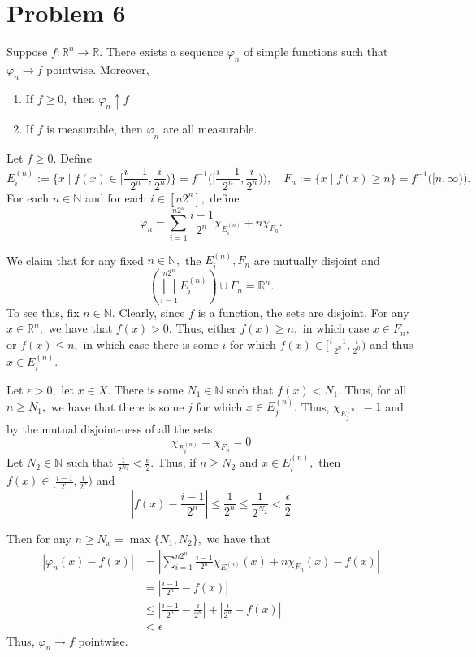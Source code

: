 \documentclass[11pt]{article}
\newcommand{\bbN}{\mathbb{N}}
\newcommand{\bbR}{\mathbb{R}}
\begin{document}
\section*{Problem 6}
\begin{problem}
    Suppose $f: \bbR^n \to \bbR.$ There exists a sequence $\varphi_n$ of simple functions such that $\varphi_n \to f$ pointwise. Moreover, 
    \begin{enumerate}
        \item If $f \geq 0,$ then  $\varphi_n \uparrow f$
        \item If $f $ is measurable, then $\varphi_n$ are all measurable.
    \end{enumerate}
\end{problem}
\begin{solution}
    Let $f\geq 0.$ Define
    \[E_{i}^{(n)} := \{x \mid f(x) \in [\frac{i-1}{2^n}, \frac{i}{2^n})\} = f^{-1}\big([\frac{i-1}{2^n}, \frac{i}{2^n})\big), \quad F_n := \{x\mid f(x) \geq n\} = f^{-1}\big([n, \infty)\big).\] For each $n \in \bbN$ and for each $i \in [n2^n],$ define 
    \[\varphi_n = \sum_{i=1}^{n2^n} \frac{i-1}{2^n}\chi_{E_i^{(n)}} + n\chi_{F_n}.\] 

We claim that for any fixed $n \in \bbN,$ the $E_{i}^{(n)}, F_n$ are mutually disjoint  and
    \[\left(\bigsqcup_{i=1}^{n2^n} E_{i}^{(n)} \right)\cup F_n = \bbR^n.\] To see this, fix $n \in \bbN.$ Clearly, since $f$ is a function, the sets are disjoint. For any $x\in \bbR^n,$ we have that $f(x) > 0.$ Thus, either $f(x) \geq n,$ in which case $x\in F_n,$ or $f(x) \leq n,$ in which case there is some $i$ for which $f(x)\in [\frac{i-1}{2^n}, \frac{i}{2^n})$ and thus $x\in E_{i}^{(n)}.$  
    
    Let $\epsilon>0,$ let $x \in X.$ There is some $N_1 \in \bbN$ such that $f(x) < N_1.$ Thus, for all $n \geq N_1,$ we have that there is some $j$ for which $x \in E_j^{(n)}.$ Thus, $\chi_{E_j^{(n)}} = 1$ and by the mutual disjoint-ness of all the sets, 
    \[\chi_{E_i^{(n)}} = \chi_{F_n} = 0\]
    Let $N_2 \in \bbN$ such that $\frac{1}{2^{N_2}} < \frac{\epsilon}{2}.$  Thus, if $n\geq N_2$ and $x\in E_{i   }^{(n)},$ then $f(x) \in [\frac{i-1}{2^n}, \frac{i}{2^n})$ and \[|f(x) - \frac{i-1}{2^n}| \leq \frac{1}{2^n} \leq \frac{1}{2^{N_2}} < \frac{\epsilon}{2}\]
    
    Then for any $n \geq N_x = \max\{N_1, N_2\},$ we have that
    \begin{align*}
        |\varphi_n(x) - f(x)| &= \left|\sum_{i=1}^{n2^n} \frac{i-1}{2^n}\chi_{E_i^{(n)}}(x) + n\chi_{F_n}(x) - f(x)\right|\\
        &= \left|\frac{i-1}{2^n} - f(x)\right|\\
        &\leq \left|\frac{i-1}{2^n}  - \frac{i}{2^n} \right| + \left|\frac{i}{2^n} - f(x) \right|\\
        &< \epsilon
    \end{align*}
    Thus, $\varphi_n \to f$ pointwise. 


\end{solution}
\end{document}
